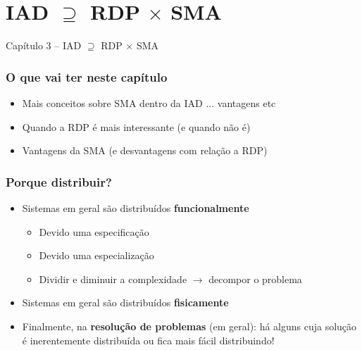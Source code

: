 
\section{IAD $\supseteq $ RDP $\times$ SMA }
\begin{frame}

\begin{center}
{\huge Capítulo 3 -- IAD $\supseteq $ RDP $\times$ SMA }
\end{center}

\end{frame}

\begin{frame} %


\frametitle{O que vai ter neste capítulo}

\begin{itemize}
  \item Mais conceitos sobre SMA dentro da IAD ... vantagens etc
  \item Quando a RDP é mais interessante (e quando não é)
  \item Vantagens da SMA (e desvantagens com relação a RDP)
\end{itemize}


\end{frame}



\begin{frame} %


\frametitle{Porque distribuir?}

\begin{itemize}
  \item Sistemas em geral são distribuídos \textbf{funcionalmente}
  \pause
  \begin{itemize}
    \item Devido uma especificação
    \item Devido uma especialização
    \item Dividir e diminuir a complexidade $\rightarrow$ decompor o problema
    
  \end{itemize}

  \pause
  \item Sistemas em geral são distribuídos \textbf{fisicamente}
  \pause  
  \item Finalmente, na \textbf{resolução de problemas} (em geral): 
  há alguns cuja solução é inerentemente distribuída ou 
  fica mais fácil distribuindo!
  

\end{itemize}


\end{frame}


